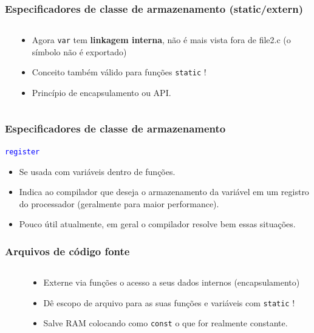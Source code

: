 \documentclass{beamer}
\begin{document}
\begin{frame}
	\frametitle{Especificadores de classe de armazenamento (static/extern)}
	\begin{columns}[T] %
		\begin{column}{.57\textwidth}
			
			
			
		\end{column}%
		\hfill%
		\begin{column}{.43\textwidth}
			\begin{itemize}
				\item Agora \texttt{var} tem \textbf{linkagem interna}, não é mais vista fora de file2.c (o símbolo não é exportado)
				\item Conceito também válido para funções \texttt{static} !
				\item Princípio de encapsulamento ou API.
			\end{itemize}
		\end{column}%
	\end{columns}
\end{frame}

\begin{frame}
	\frametitle{Especificadores de classe de armazenamento}
	\begin{center}
		\texttt{\textcolor{blue}{register}}
	\end{center}
	\vspace*{0.5cm}
	\begin{itemize}
		\item Se usada com variáveis dentro de funções.
		\item Indica ao compilador que deseja o armazenamento da variável em um registro do processador (geralmente para maior performance).
		\item Pouco útil atualmente, em geral o compilador resolve bem essas situações.
	\end{itemize}
\end{frame}

\begin{frame}
	\frametitle{Arquivos de código fonte}
	\begin{columns}[T] %
		\begin{column}{.60\textwidth}
			
		\end{column}%
		\hfill%
		\begin{column}{.40\textwidth}
			\begin{itemize}
				\item Externe via funções o acesso a seus dados internos (encapsulamento)
				\item Dê escopo de arquivo para as suas funções e variáveis com \texttt{static} !
				\item Salve RAM colocando como \texttt{const} o que for realmente constante.
			\end{itemize}
		\end{column}%
	\end{columns}
\end{frame}
\end{document}
